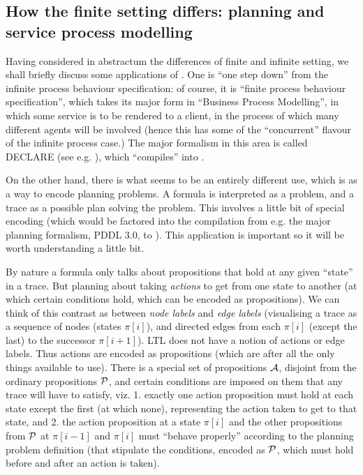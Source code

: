 \subsection{How the finite setting differs: planning and service process modelling}

Having considered in abstractum the differences of finite and infinite setting, we shall briefly discuss some applications of \ltlf.
One is ``one step down'' from the infinite process behaviour specification: of course, it is ``finite process behaviour specification'', which takes its major form in
``Business Process Modelling'', in which some service is to be rendered to a client, in the process of which many different agents will be involved
(hence this has some of the ``concurrent'' flavour of the infinite process case.)
The major formalism in this area is called DECLARE (see e.g. \cite{decserflow}), which ``compiles'' into \ltlf.

On the other hand, there is what seems to be an entirely different use, which is as a way to encode planning problems.
A formula is interpreted as a problem, and a trace as a possible plan solving the problem.
This involves a little bit of special encoding (which would be factored into the compilation from e.g. the major planning formalism,
PDDL 3.0, to \ltlf). This application is important so it will be worth understanding a little bit.

By nature a formula only talks about propositions that hold at any given ``state'' in a trace.
But planning about taking \emph{actions} to get from one state to another (at which certain conditions hold, which can be encoded as propositions).
We can think of this contrast as between \emph{node labels} and \emph{edge labels}
(visualising a trace as a sequence of nodes (states $\pi[i]$), and directed edges from each $\pi[i]$ (except the last) to the successor $\pi[i+1]$).
LTL does not have a notion of actions or edge labels.
Thus actions are encoded as propositions (which are after all the only things available to use).
There is a special set of propositions $\mathcal{A}$, disjoint from the ordinary propositions $\mathcal{P}$,
and certain conditions are imposed on them that any trace will have to satisfy, viz.
1. exactly one action proposition must hold at each state except the first (at which none),
representing the action taken to get to that state,
and 2. the action proposition at a state $\pi[i]$
and the other propositions from $\mathcal{P}$ at $\pi[i-1]$ and $\pi[i]$ must
``behave properly'' according to the planning problem definition (that stipulate the conditions, encoded as $\mathcal{P}$, which must hold before and after an action is taken).

